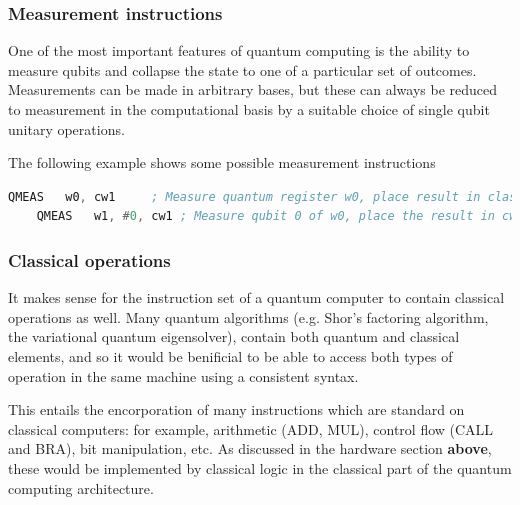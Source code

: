 \subsubsection{Measurement instructions}

One of the most important features of quantum computing is the ability to measure qubits and collapse the state to one of a particular set of outcomes. Measurements can be made in arbitrary bases, but these can always be reduced to measurement in the computational basis by a suitable choice of single qubit unitary operations. 

The following example shows some possible measurement instructions
\begin{lstlisting}[language=asm,caption={Quantum register measurement}]
    QMEAS   w0, cw1     ; Measure quantum register w0, place result in classical register cw1
    QMEAS   w1, #0, cw1 ; Measure qubit 0 of w0, place the result in cw1
\end{lstlisting}

\subsubsection{Classical operations}

It makes sense for the instruction set of a quantum computer to contain classical operations as well. Many quantum algorithms (e.g. Shor's factoring algorithm, the variational quantum eigensolver), contain both quantum and classical elements, and so it would be benificial to be able to access both types of operation in the same machine using a consistent syntax. 

This entails the encorporation of many instructions which are standard on classical computers: for example, arithmetic (ADD, MUL), control flow (CALL and BRA), bit manipulation, etc. As discussed in the hardware section \textbf{above}, these would be implemented by classical logic in the classical part of the quantum computing architecture. 

